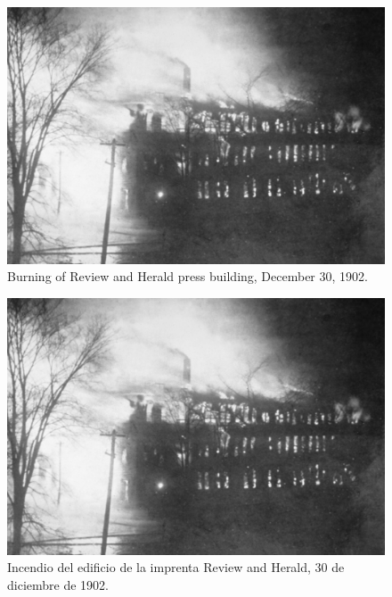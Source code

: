 \begin{figure}[h]
    \centering
    \includegraphics[width=1\linewidth]{images/review-and-herlad.jpg}
    \caption*{Burning of Review and Herald press building, December 30, 1902.}
    \label{fig:review-and-herald}
\end{figure}


\begin{figure}[h]
    \centering
    \includegraphics[width=1\linewidth]{images/review-and-herlad.jpg}
    \caption*{Incendio del edificio de la imprenta Review and Herald, 30 de diciembre de 1902.}
    \label{fig:review-and-herald}
\end{figure}


